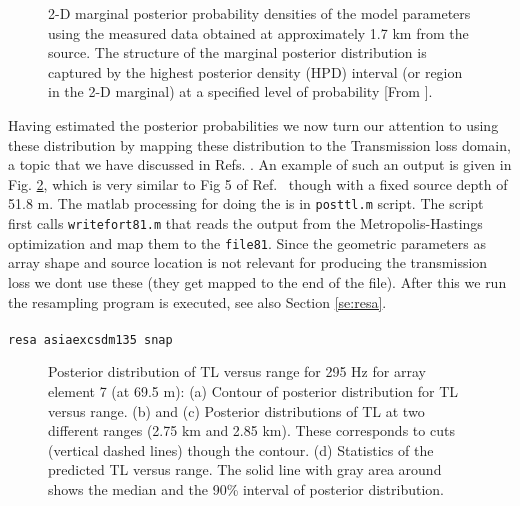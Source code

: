 \documentclass{saclantc}
\begin{document}
\begin{figure}
\epsfxsize=15cm
\centerline{}
\caption{2-D marginal posterior probability densities of
the model parameters using the measured data obtained at
approximately 1.7 km from the source. The  structure
of the marginal posterior distribution is captured by the highest
posterior density (HPD) interval (or region in the 2-D marginal) at
a specified level of probability [From \cite{huang06}]. }
\label{fig:2dppd}
\end{figure}


Having estimated the posterior probabilities we now turn our attention to using these distribution by mapping these distribution to the Transmission loss domain, a topic that we have discussed in Refs. \cite{gerstoft06, huang06, goh07}.
An example of such an output is given in Fig. \ref{fig:fig5abc}, which is very similar to Fig 5 of Ref.~\cite{huang06} though with a fixed source depth of 51.8 m.
The {\sc matlab} processing for doing the is in {\tt posttl.m} script. The script first calls {\tt writefort81.m}  that reads the output from the Metropolis-Hastings optimization and map them to the {\tt file81}.  Since the geometric parameters as array shape and source location is not relevant for producing the transmission loss we dont use these (they get mapped to the end of the file). After this we run the resampling program is executed, see also  Section \ref{se:resa}.
\\
\\
{\tt resa asiaexcsdm135 snap}
\\





\begin{figure}
\epsfxsize=10cm
\centerline{}
\centerline{}
\caption{Posterior distribution of TL versus range
        for 295 Hz for array element 7 (at 69.5 m):
        (a) Contour of posterior distribution for TL
        versus range. (b) and (c) Posterior
        distributions of TL at two different ranges
        (2.75 km and 2.85 km).
        These corresponds to cuts (vertical dashed lines)
        though the contour.
        (d) Statistics of the predicted TL versus range.
        The solid line with gray area around shows
        the median and the 90\% interval of posterior distribution.}
\label{fig:fig5abc}
\end{figure}
\end{document}
